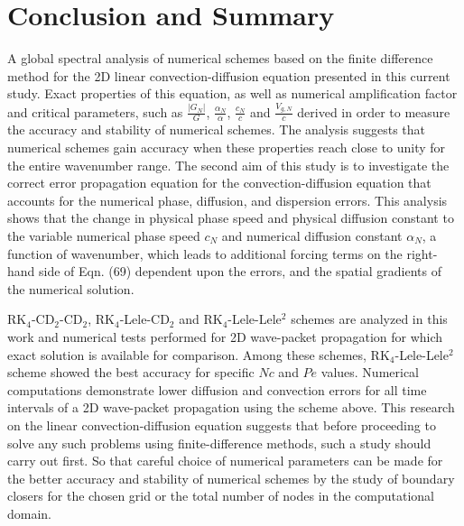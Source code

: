 \documentclass[showpacs,preprintnumbers,amsmath,amssymb]{revtex4-1} %
\begin{document}
\section{Conclusion and Summary}

A global spectral analysis of numerical schemes based on the finite difference method for the 2D linear convection-diffusion equation presented in this current study. Exact properties of this equation, as well as numerical amplification factor and critical parameters, such as $\frac{|G_N|}{G}$, $\frac{\alpha_N}{\alpha}$, $\frac{c_N}{c}$ and $\frac{V_{g,N}}{c}$ derived in order to measure the accuracy and stability of numerical schemes. The analysis suggests that numerical schemes gain accuracy when these properties reach close to unity for the entire wavenumber range. The second aim of this study is to investigate the correct error propagation equation for the convection-diffusion equation that accounts for the numerical phase, diffusion, and dispersion errors. This analysis shows that the change in physical phase speed and physical diffusion constant to the variable numerical phase speed $c_N$ and numerical diffusion constant $\alpha_N$, a function of wavenumber, which leads to additional forcing terms on the right-hand side of Eqn. (69) dependent upon the errors, and the spatial gradients of the numerical solution.

RK$_4$-CD$_2$-CD$_2$, RK$_4$-Lele-CD$_2$ and RK$_4$-Lele-Lele$^2$ schemes are analyzed in this work and numerical tests performed for 2D wave-packet propagation for which exact solution is available for comparison. Among these schemes, RK$_4$-Lele-Lele$^2$ scheme showed the best accuracy for specific $Nc$ and $Pe$ values. Numerical computations demonstrate lower diffusion and convection errors for all time intervals of a 2D wave-packet propagation using the scheme above. This research on the linear convection-diffusion equation suggests that before proceeding to solve any such problems using finite-difference methods, such a study should carry out first. So that careful choice of numerical parameters can be made for the better accuracy and stability of numerical schemes by the study of boundary closers for the chosen grid or the total number of nodes in the computational domain.

\clearpage

%
%

\end{document}
